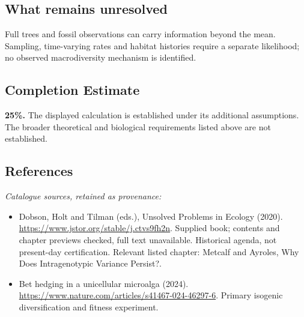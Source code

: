 \documentclass[11pt]{article}
\begin{document}
\subsection{What remains unresolved}
Full trees and fossil observations can carry information beyond the mean. Sampling, time-varying rates and habitat histories require a separate likelihood; no observed macrodiversity mechanism is identified.
\subsection{Completion Estimate}
\textbf{25\%.} The displayed calculation is established under its additional assumptions. The broader theoretical and biological requirements listed above are not established.
\subsection{References}
\noindent\emph{Catalogue sources, retained as provenance:}
\begin{itemize}
\item Dobson, Holt and Tilman (eds.), Unsolved Problems in Ecology (2020). \url{https://www.jstor.org/stable/j.ctvs9fh2n}. Supplied book; contents and chapter previews checked, full text unavailable. Historical agenda, not present-day certification. Relevant listed chapter: Metcalf and Ayroles, Why Does Intragenotypic Variance Persist?.
\item Bet hedging in a unicellular microalga (2024). \url{https://www.nature.com/articles/s41467-024-46297-6}. Primary isogenic diversification and fitness experiment.
\end{itemize}
\clearpage


\appendix
\end{document}
